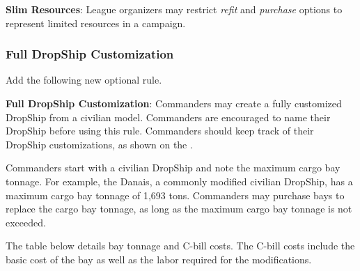 \begin{description}

\item {\bfseries Slim Resources}: League organizers may restrict \emph{refit} and \emph{purchase} options to represent limited resources in a campaign.

\end{description}

\subsubsection{Full DropShip Customization}

Add the following new optional rule.

\begin{description}

\item {\bfseries Full DropShip Customization}: Commanders may create a fully customized DropShip from a civilian model.
Commanders are encouraged to name their DropShip before using this rule.
Commanders should keep track of their DropShip customizations, as shown on the .

Commanders start with a civilian DropShip and note the maximum cargo bay tonnage.
For example, the Danais, a commonly modified civilian DropShip, has a maximum cargo bay tonnage of 1,693 tons.
Commanders may purchase bays to replace the cargo bay tonnage, as long as the maximum cargo bay tonnage is not exceeded.

The table below details bay tonnage and C-bill costs.
The C-bill costs include the basic cost of the bay as well as the labor required for the modifications.


\end{description}

